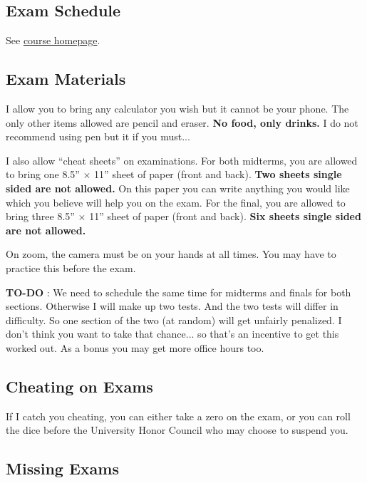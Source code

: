 \documentclass[12pt]{article}
\newcommand{\inred}[1]{\color{red}\textbf{#1} \color{black}}
\newcommand{\coursewebpage}{\href{https://github.com/kapelner/QC_Math_621_Fall_2020}{course homepage}}
\newcommand{\qu}[1]{``#1''}
\begin{document}
\subsection*{Exam Schedule}\label{subsec:exam_schedule}

See \coursewebpage.

\subsection*{Exam Materials}

I allow you to bring any calculator you wish but it cannot be your phone. The only other items allowed are pencil and eraser. \inred{No food, only drinks.} I do not recommend using pen but it if you must...

I also allow \qu{cheat sheets} on examinations. For both midterms, you are allowed to bring one 8.5'' $\times$ 11'' sheet of paper (front and back). \inred{Two sheets single sided are not allowed.} On this paper you can write anything you would like which you believe will help you on the exam. For the final, you are allowed to bring three 8.5'' $\times$ 11'' sheet of paper (front and back). \inred{Six sheets single sided are not allowed.} %

On zoom, the camera must be on your hands at all times. You may have to practice this before the exam.

\inred{TO-DO}: We need to schedule the same time for midterms and finals for both sections. Otherwise I will make up two tests. And the two tests will differ in difficulty. So one section of the two (at random) will get unfairly penalized. I don't think you want to take that chance... so that's an incentive to get this worked out. As a bonus you may get more office hours too.

\subsection*{Cheating on Exams}

If I catch you cheating, you can either take a zero on the exam, or you can roll the dice before the University Honor Council who may choose to suspend you.


\subsection*{Missing Exams}
\end{document}
